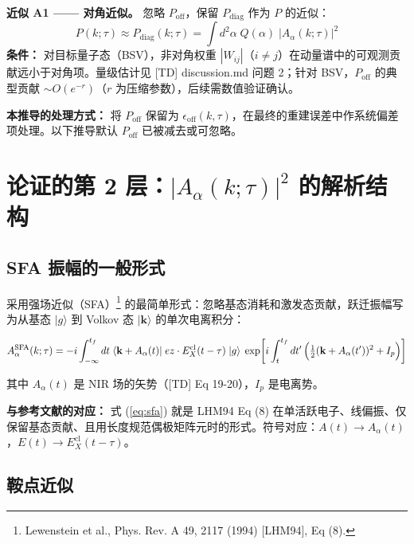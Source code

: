 \documentclass[12pt,a4paper]{ctexart}
\begin{document}
\begin{approxbox}
\textbf{近似 A1 —— 对角近似。} 忽略 $P_{\text{off}}$，保留 $P_{\text{diag}}$ 作为 $P$ 的近似：
\[
P(k;\tau) \approx P_{\text{diag}}(k;\tau) = \int d^2\alpha\; Q(\alpha)\;|A_\alpha(k;\tau)|^2
\]
\textbf{条件：} 对目标量子态（BSV），非对角权重 $|W_{ij}|$（$i\neq j$）在动量谱中的可观测贡献远小于对角项。量级估计见 [TD] discussion.md 问题 2；针对 BSV，$P_{\text{off}}$ 的典型贡献 $\sim O(e^{-r})$（$r$ 为压缩参数），后续需数值验证确认。

\textbf{本推导的处理方式：} 将 $P_{\text{off}}$ 保留为 $\epsilon_{\text{off}}(k,\tau)$，在最终的重建误差中作系统偏差项处理。以下推导默认 $P_{\text{off}}$ 已被减去或可忽略。
\end{approxbox}

\section{论证的第 2 层：$|A_\alpha(k;\tau)|^2$ 的解析结构}

\subsection{SFA 振幅的一般形式}

采用强场近似（SFA）\footnote{Lewenstein et al., Phys. Rev. A 49, 2117 (1994) [LHM94], Eq (8).} 的最简单形式：忽略基态消耗和激发态贡献，跃迁振幅写为从基态 $|g\rangle$ 到 Volkov 态 $|\mathbf{k}\rangle$ 的单次电离积分：

\begin{equation}\label{eq:sfa}
A_\alpha^{\text{SFA}}(k;\tau) = -i\int_{-\infty}^{t_f} dt\;
\langle\mathbf{k}+A_\alpha(t)|\; ez\cdot E_X^{\text{cl}}(t-\tau)\;|g\rangle\;
\exp\!\left[i\int_t^{t_f} dt'\,\Bigl(\tfrac12(\mathbf{k}+A_\alpha(t'))^2 + I_p\Bigr)\right]
\end{equation}

其中 $A_\alpha(t)$ 是 NIR 场的矢势（[TD] Eq 19-20），$I_p$ 是电离势。

\begin{refbox}
\textbf{与参考文献的对应：} 式 (\ref{eq:sfa}) 就是 LHM94 Eq (8) 在单活跃电子、线偏振、仅保留基态贡献、且用长度规范偶极矩阵元时的形式。符号对应：$A(t) \to A_\alpha(t)$，$E(t) \to E_X^{\text{cl}}(t-\tau)$。
\end{refbox}

\subsection{鞍点近似}
\end{document}
